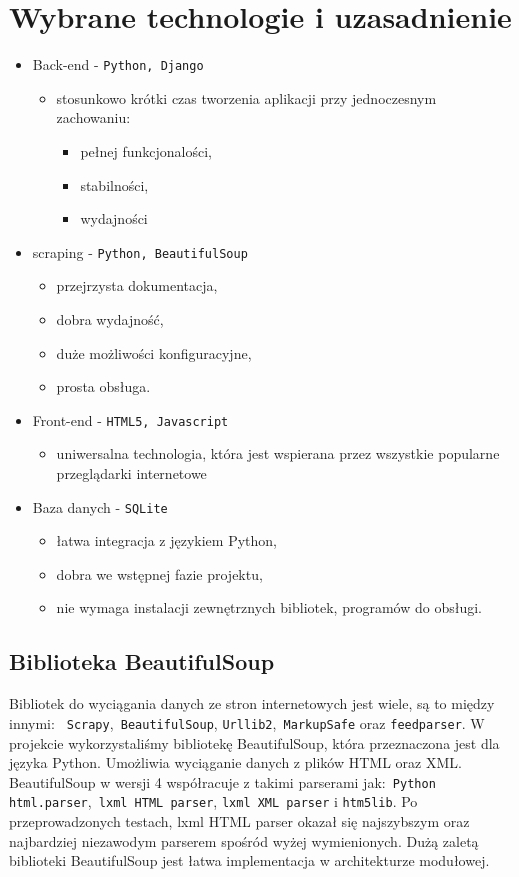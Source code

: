 \documentclass[12pt, titlepage]{article}
\begin{document}
	\section{Wybrane technologie i uzasadnienie}
	\begin{itemize}
		\item Back-end - \texttt{Python, Django}
		\begin{itemize}
			\item stosunkowo krótki czas tworzenia aplikacji przy jednoczesnym zachowaniu: \begin{itemize}
				\item pełnej funkcjonalości,
				\item stabilności,
				\item wydajności	
			\end{itemize}
		\end{itemize}
		\item scraping - \texttt{Python, BeautifulSoup}
		\begin{itemize}
			\item przejrzysta dokumentacja,
			\item dobra wydajność,
			\item duże możliwości konfiguracyjne,
			\item prosta obsługa.
		\end{itemize}
		\item Front-end - \texttt{HTML5, Javascript}
		\begin{itemize}
			\item uniwersalna technologia, która jest wspierana przez wszystkie popularne przeglądarki internetowe
		\end{itemize}
		\item Baza danych - \texttt{SQLite}
		\begin{itemize}
			\item łatwa integracja z językiem Python,
			\item dobra we wstępnej fazie projektu,
			\item nie wymaga instalacji zewnętrznych bibliotek, programów do obsługi.
		\end{itemize}
	\end{itemize}
	
	\subsection{Biblioteka BeautifulSoup}
	Bibliotek do wyciągania danych ze stron internetowych jest wiele, są to między innymi: \texttt{ Scrapy},\texttt{ BeautifulSoup}, \texttt{Urllib2},\texttt{ MarkupSafe} oraz \texttt{feedparser}. W projekcie wykorzystaliśmy bibliotekę BeautifulSoup, która przeznaczona jest dla języka Python. Umożliwia wyciąganie danych z plików HTML oraz XML. BeautifulSoup w wersji 4 współracuje z takimi parserami jak:\texttt{ Python html.parser},\texttt{ lxml HTML parser}, \texttt{lxml XML parser} i \texttt{htm5lib}. Po przeprowadzonych testach, lxml HTML parser okazał się najszybszym oraz najbardziej niezawodym parserem spośród wyżej wymienionych. Dużą zaletą biblioteki BeautifulSoup jest łatwa implementacja w architekturze modułowej.
\end{document}

